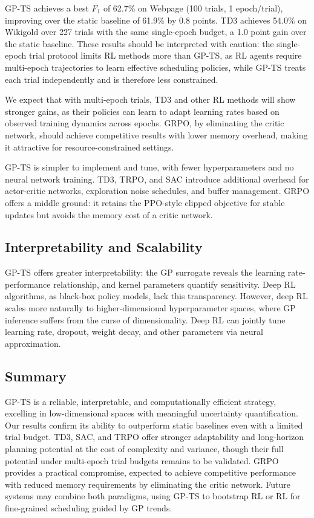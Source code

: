 \documentclass[11pt]{article}
\begin{document}
GP-TS achieves a best $F_1$ of 62.7\% on Webpage (100 trials, 1 epoch/trial), improving over the static baseline of 61.9\% by 0.8 points. TD3 achieves 54.0\% on Wikigold over 227 trials with the same single-epoch budget, a 1.0 point gain over the static baseline. These results should be interpreted with caution: the single-epoch trial protocol limits RL methods more than GP-TS, as RL agents require multi-epoch trajectories to learn effective scheduling policies, while GP-TS treats each trial independently and is therefore less constrained.

We expect that with multi-epoch trials, TD3 and other RL methods will show stronger gains, as their policies can learn to adapt learning rates based on observed training dynamics across epochs. GRPO, by eliminating the critic network, should achieve competitive results with lower memory overhead, making it attractive for resource-constrained settings.

GP-TS is simpler to implement and tune, with fewer hyperparameters and no neural network training. TD3, TRPO, and SAC introduce additional overhead for actor-critic networks, exploration noise schedules, and buffer management. GRPO offers a middle ground: it retains the PPO-style clipped objective for stable updates but avoids the memory cost of a critic network.

\subsection{Interpretability and Scalability}

GP-TS offers greater interpretability: the GP surrogate reveals the learning rate-performance relationship, and kernel parameters quantify sensitivity. Deep RL algorithms, as black-box policy models, lack this transparency. However, deep RL scales more naturally to higher-dimensional hyperparameter spaces, where GP inference suffers from the curse of dimensionality. Deep RL can jointly tune learning rate, dropout, weight decay, and other parameters via neural approximation.

\subsection{Summary}

GP-TS is a reliable, interpretable, and computationally efficient strategy, excelling in low-dimensional spaces with meaningful uncertainty quantification. Our results confirm its ability to outperform static baselines even with a limited trial budget. TD3, SAC, and TRPO offer stronger adaptability and long-horizon planning potential at the cost of complexity and variance, though their full potential under multi-epoch trial budgets remains to be validated. GRPO provides a practical compromise, expected to achieve competitive performance with reduced memory requirements by eliminating the critic network. Future systems may combine both paradigms, using GP-TS to bootstrap RL or RL for fine-grained scheduling guided by GP trends.
\end{document}
